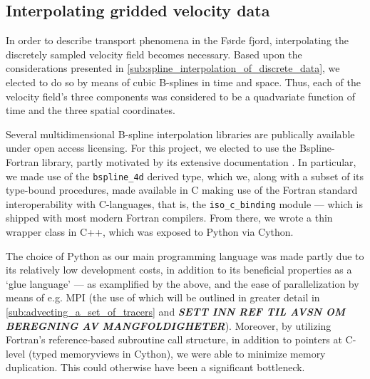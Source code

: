 

\subsection{Interpolating gridded velocity data}
\label{sub:interpolating_gridded_velocity_data}

In order to describe transport phenomena in the Førde fjord, interpolating
the discretely sampled velocity field becomes necessary. Based upon the
considerations presented in \cref{sub:spline_interpolation_of_discrete_data},
we elected to do so by means of cubic B-splines in time and space. Thus,
each of the velocity field's three components was considered to be a
quadvariate function of time and the three spatial coordinates.

Several multidimensional B-spline interpolation libraries are publically
available under open access licensing. For this project, we elected to use
the Bspline-Fortran library, partly motivated by its extensive documentation
\parencite{williams2018bspline}. In particular, we made use of the
\texttt{bspline\_4d} derived type, which we, along with a subset of its
type-bound procedures, made available in C making use of the Fortran standard
interoperability with C-languages, that is, the \texttt{iso\_c\_binding} module
--- which is shipped with most modern Fortran compilers. From there, we wrote a
thin wrapper class in C++, which was exposed to Python via Cython.

The choice of Python as our main programming language was made partly due to
its relatively low development costs, in addition to its beneficial properties
as a `glue language' --- as examplified by the above, and the ease of
parallelization by means of e.g. MPI (the use of which will be outlined in
greater detail in \cref{sub:advecting_a_set_of_tracers} and
\emph{\textbf{SETT INN REF TIL AVSN OM BEREGNING AV MANGFOLDIGHETER}}).
Moreover, by utilizing Fortran's reference-based subroutine call structure, in
addition to pointers at C-level (typed memoryviews in Cython), we were able to
minimize memory duplication. This could otherwise have been a significant
bottleneck.

